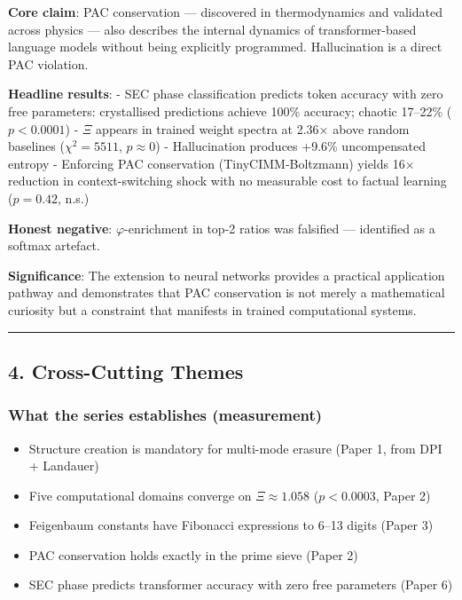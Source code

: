\documentclass[
  11pt,
  a4paper]{article}
\providecommand{\tightlist}{%
  \setlength{\itemsep}{0pt}\setlength{\parskip}{0pt}}
\begin{document}
\textbf{Core claim}: PAC conservation --- discovered in thermodynamics
and validated across physics --- also describes the internal dynamics of
transformer-based language models without being explicitly programmed.
Hallucination is a direct PAC violation.

\textbf{Headline results}: - SEC phase classification predicts token
accuracy with zero free parameters: crystallised predictions achieve
100\% accuracy; chaotic 17--22\% (\(p < 0.0001\)) - \(\Xi\) appears in
trained weight spectra at 2.36× above random baselines
(\(\chi^2 = 5511\), \(p \approx 0\)) - Hallucination produces +9.6\%
uncompensated entropy - Enforcing PAC conservation (TinyCIMM-Boltzmann)
yields 16× reduction in context-switching shock with no measurable cost
to factual learning (\(p = 0.42\), n.s.)

\textbf{Honest negative}: \(\varphi\)-enrichment in top-2 ratios was
falsified --- identified as a softmax artefact.

\textbf{Significance}: The extension to neural networks provides a
practical application pathway and demonstrates that PAC conservation is
not merely a mathematical curiosity but a constraint that manifests in
trained computational systems.

\begin{center}\rule{0.5\linewidth}{0.5pt}\end{center}

\subsection{4. Cross-Cutting Themes}\label{cross-cutting-themes}

\subsubsection{What the series establishes
(measurement)}\label{what-the-series-establishes-measurement}

\begin{itemize}
\tightlist
\item
  Structure creation is mandatory for multi-mode erasure (Paper 1, from
  DPI + Landauer)
\item
  Five computational domains converge on \(\Xi \approx 1.058\)
  (\(p < 0.0003\), Paper 2)
\item
  Feigenbaum constants have Fibonacci expressions to 6--13 digits (Paper
  3)
\item
  PAC conservation holds exactly in the prime sieve (Paper 2)
\item
  SEC phase predicts transformer accuracy with zero free parameters
  (Paper 6)
\end{itemize}
\end{document}
